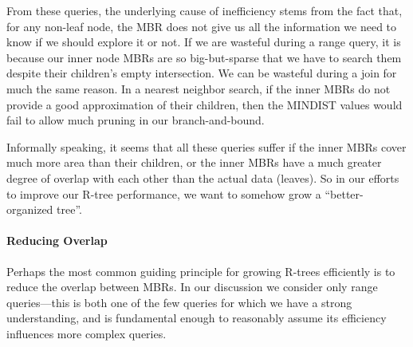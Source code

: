 From these queries, the underlying cause of inefficiency stems from the fact that, for any non-leaf node, the MBR does not give us all the information we need to know if we should explore it or not.
If we are wasteful during a range query, it is because our inner node MBRs are so big-but-sparse that we have to search them despite their children's empty intersection.
We can be wasteful during a join for much the same reason.
In a nearest neighbor search, if the inner MBRs do not provide a good approximation of their children, then the MINDIST values would fail to allow much pruning in our branch-and-bound.

Informally speaking, it seems that all these queries suffer if the inner MBRs cover much more area than their children, or the inner MBRs have a much greater degree of overlap with each other than the actual data (leaves).
So in our efforts to improve our R-tree performance, we want to somehow grow a ``better-organized tree''.





\paragraph{Reducing Overlap}
Perhaps the most common guiding principle for growing R-trees efficiently is to reduce the overlap between MBRs.
In our discussion we consider only range queries---this is both one of the few queries for which we have a strong understanding, and is fundamental enough to reasonably assume its efficiency influences more complex queries.

